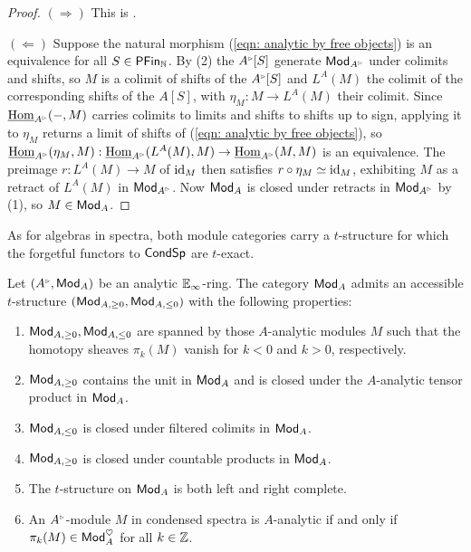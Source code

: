 \begin{proof}
    $(\Rightarrow)$ This is \cite[Cor. 7.6]{RagimovReflection}. 

    $(\Leftarrow)$ Suppose the natural morphism (\ref{eqn: analytic by free objects}) is an equivalence for all $S\in\mathsf{PFin}_{\mathbb{N}}$. By  (2) the $A^{\tri}[S]$ generate $\Mod_{A^{\tri}}$ under colimits and shifts, so $M$ is a colimit of shifts of the $A^{\tri}[S]$ and $L^{A}(M)$ the colimit of the corresponding shifts of the $A[S]$, with $\eta_{M}:M\to L^{A}(M)$ their colimit. Since $\intHom_{A^{\tri}}(-,M)$ carries colimits to limits and shifts to shifts up to sign, applying it to $\eta_{M}$ returns a limit of shifts of (\ref{eqn: analytic by free objects}), so $\intHom_{A^{\tri}}(\eta_{M},M):\intHom_{A^{\tri}}(L^{A}(M),M)\to\intHom_{A^{\tri}}(M,M)$ is an equivalence. The preimage $r:L^{A}(M)\to M$ of $\mathrm{id}_{M}$ then satisfies $r\circ\eta_{M}\simeq\mathrm{id}_{M}$, exhibiting $M$ as a retract of $L^{A}(M)$ in $\Mod_{A^{\tri}}$. Now $\mathsf{Mod}_{A}$ is closed under retracts in $\Mod_{A^{\tri}}$ by  (1), so $M\in\mathsf{Mod}_{A}$. 
\end{proof}
As for algebras in spectra, both module categories carry a $t$-structure for which the forgetful functors to $\mathsf{Cond}\mathsf{Sp}$ are $t$-exact.
\begin{proposition}\label{prop: t-structure on A-analytic modules}
    Let $(A^{\tri},\Mod_{A})$ be an analytic $\mathbb{E}_{\infty}$-ring. The category $\mathsf{Mod}_{A}$ admits an accessible $t$-structure $(\mathsf{Mod}_{A,\geq0},\mathsf{Mod}_{A,\leq0})$ with the following properties:
    \begin{enumerate}[label=(\roman*)]
        \item $\mathsf{Mod}_{A,\geq0},\mathsf{Mod}_{A,\leq0}$ are spanned by those $A$-analytic modules $M$ such that the homotopy sheaves $\pi_{k}(M)$ vanish for $k<0$ and $k>0$, respectively.
        \item $\mathsf{Mod}_{A,\geq0}$ contains the unit in $\mathsf{Mod}_{A}$ and is closed under the $A$-analytic tensor product in $\mathsf{Mod}_{A}$. 
        \item $\mathsf{Mod}_{A,\leq0}$ is closed under filtered colimits in $\mathsf{Mod}_{A}$. 
        \item $\mathsf{Mod}_{A,\geq0}$ is closed under countable products in $\mathsf{Mod}_{A}$.
        \item The $t$-structure on $\mathsf{Mod}_{A}$ is both left and right complete. 
        \item An $A^{\tri}$-module $M$ in condensed spectra is $A$-analytic if and only if $\pi_{k}(M)\in\mathsf{Mod}_{A}^{\heartsuit}$ for all $k\in\mathbb{Z}$. 
    \end{enumerate}
\end{proposition} 
